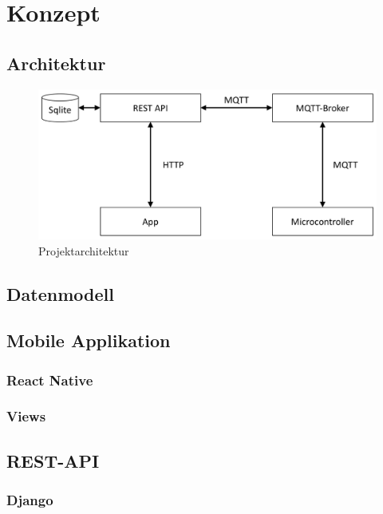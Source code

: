 \section{Konzept}

    \subsection{Architektur}
    \begin{figure}[H]
        \centering
        \includegraphics[width=0.7\linewidth]{../Pictures/Konzept/Architecture}
        \caption{Projektarchitektur}
        \label{fig:architecture}
    \end{figure}
    
    \subsection{Datenmodell}
    
    \subsection{Mobile Applikation}

        \subsubsection{React Native}
        \subsubsection{Views}

    \subsection{REST-API}

        \subsubsection{Django}
